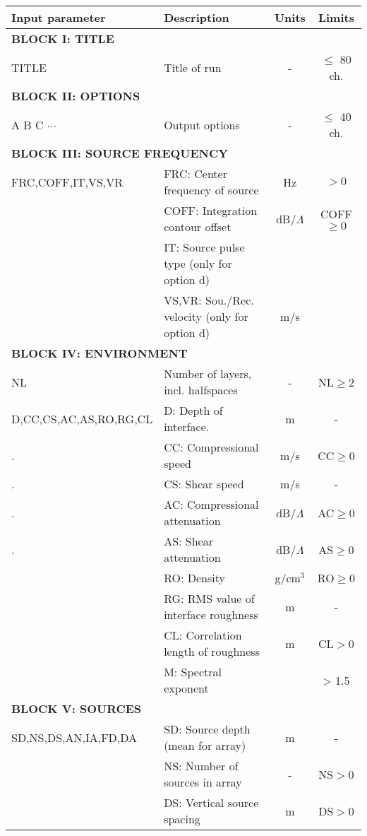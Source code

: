 \begin{table}
\begin{center}
\small
\begin{tabular}{|l|l|c|c|}
\hline \hline
Input parameter & Description & Units & Limits \\
\hline \hline
\multicolumn{4}{|l|}{\bf BLOCK I: TITLE } \\
\hline
TITLE & Title of run  & - & $\leq$ 80 ch. \\
\hline
\multicolumn{4}{|l|}{\bf BLOCK II: OPTIONS} \\
\hline
A B C $\cdots$ & Output options & - & $\leq$ 40 ch. \\
\hline
\multicolumn{4}{|l|}{\bf BLOCK III: SOURCE FREQUENCY} \\
\hline
FRC,COFF,IT,VS,VR & FRC: Center frequency of source & Hz & $>0$ \\
 	& COFF: Integration contour offset & dB/$\Lambda$ & COFF$\geq 0$ \\
        & IT: Source pulse type (only for option d) & & \\
	& VS,VR: Sou./Rec. velocity  (only for option d) & m/s & \\
\hline
\multicolumn{4}{|l|}{\bf BLOCK IV: ENVIRONMENT} \\
\hline
NL 	& Number of layers, incl. halfspaces	& - & NL$\geq 2$  \\
D,CC,CS,AC,AS,RO,RG,CL & D: Depth of interface. & m & - \\
.	& CC: Compressional speed & m/s & CC$\geq 0$ \\
.	& CS: Shear speed & m/s & - \\
.	& AC: Compressional attenuation & dB/$\Lambda$ & AC$\geq 0$ \\
.	& AS: Shear attenuation & dB/$\Lambda$ & AS$\geq 0$ \\
	& RO: Density 	& g/cm$^{3}$ & RO$\geq 0$ \\
	& RG: RMS value of interface roughness & m & - \\
	& CL: Correlation length of roughness & m & CL$>0$ \\
	& M:  Spectral exponent &   & > 1.5 \\
\hline
\multicolumn{4}{|l|}{\bf BLOCK V: SOURCES} \\
\hline
SD,NS,DS,AN,IA,FD,DA & SD: Source depth (mean for array) & m & - \\
	& NS: Number of sources in array & - &  NS$>0$ \\
	& DS: Vertical source spacing	& m & DS$>0$ \\

\end{tabular}
\end{center}
\end{table}
